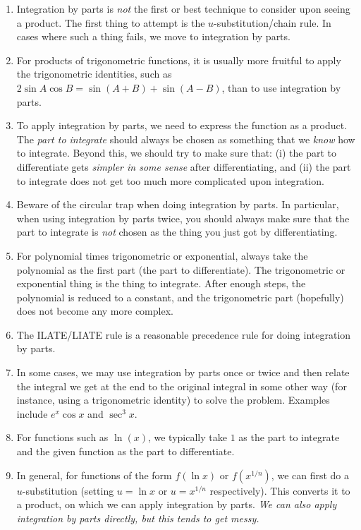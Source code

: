 \documentclass{amsart}
\begin{document}
\begin{enumerate}

\item Integration by parts is {\em not} the first or best technique to
  consider upon seeing a product. The first thing to attempt is the
  $u$-substitution/chain rule. In cases where such a thing fails, we
  move to integration by parts.
\item For products of trigonometric functions, it is usually more
  fruitful to apply the trigonometric identities, such as $2\sin A
  \cos B = \sin(A + B) + \sin(A - B)$, than to use integration by
  parts.
\item To apply integration by parts, we need to express the function
  as a product. The {\em part to integrate} should always be chosen as
  something that we {\em know} how to integrate. Beyond this, we
  should try to make sure that: (i) the part to differentiate gets
  {\em simpler in some sense} after differentiating, and (ii) the part
  to integrate does not get too much more complicated upon
  integration.
\item Beware of the circular trap when doing integration by parts. In
  particular, when using integration by parts twice, you should always
  make sure that the part to integrate is {\em not} chosen as the
  thing you just got by differentiating.
\item For polynomial times trigonometric or exponential, always take
  the polynomial as the first part (the part to differentiate). The
  trigonometric or exponential thing is the thing to integrate. After
  enough steps, the polynomial is reduced to a constant, and the
  trigonometric part (hopefully) does not become any more complex.
\item The ILATE/LIATE rule is a reasonable precedence rule for doing
  integration by parts.
\item In some cases, we may use integration by parts once or twice and
  then relate the integral we get at the end to the original integral
  in some other way (for instance, using a trigonometric identity) to
  solve the problem. Examples include $e^x \cos x$ and $\sec^3 x$.
\item For functions such as $\ln (x)$, we typically take $1$ as the
  part to integrate and the given function as the part to
  differentiate.
\item In general, for functions of the form $f(\ln x)$ or
  $f(x^{1/n})$, we can first do a $u$-substitution (setting $u = \ln
  x$ or $u = x^{1/n}$ respectively). This converts it to a product, on
  which we can apply integration by parts. {\em We can also apply
  integration by parts directly, but this tends to get messy.}
\end{enumerate}
\end{document}
